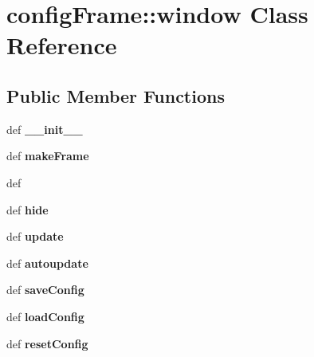 \section{config\-Frame::window Class Reference}
\label{classconfigFrame_1_1window}
\subsection*{Public Member Functions}
\begin{CompactItemize}
\item 
def \textbf{\_\-\_\-init\_\-\_\-}\label{classconfigFrame_1_1window_732edf380f9105604d18ff185c3f8ce0}

\item 
def \textbf{make\-Frame}\label{classconfigFrame_1_1window_37671e7e33f66fbd67278ba61b070726}

\item 
def {\bfshow}
\item 
def \textbf{hide}\label{classconfigFrame_1_1window_b5365cf3ea2ee9f7801b11221e01a999}

\item 
def \textbf{update}\label{classconfigFrame_1_1window_633d5287d7edcee37b5482b7556c682f}

\item 
def \textbf{autoupdate}\label{classconfigFrame_1_1window_f87dc2a4622331c88c9c6ef38d6bed78}

\item 
def \textbf{save\-Config}\label{classconfigFrame_1_1window_e466f40928ac9070f07f192b3a77b1e2}

\item 
def \textbf{load\-Config}\label{classconfigFrame_1_1window_dacd305584989dc39a67990c6d5c1dee}

\item 
def \textbf{reset\-Config}\label{classconfigFrame_1_1window_07db147a114ea9eb08e2a398c80ab420}

\end{CompactItemize}
